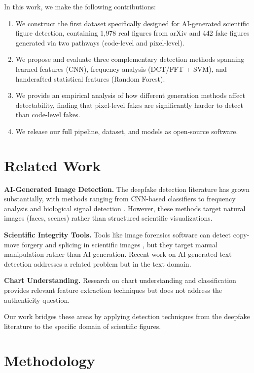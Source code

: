 \documentclass[11pt]{article}
\begin{document}
In this work, we make the following contributions:
\begin{enumerate}
    \item We construct the first dataset specifically designed for AI-generated scientific figure detection, containing 1,978 real figures from arXiv and 442 fake figures generated via two pathways (code-level and pixel-level).
    \item We propose and evaluate three complementary detection methods spanning learned features (CNN), frequency analysis (DCT/FFT + SVM), and handcrafted statistical features (Random Forest).
    \item We provide an empirical analysis of how different generation methods affect detectability, finding that pixel-level fakes are significantly harder to detect than code-level fakes.
    \item We release our full pipeline, dataset, and models as open-source software.
\end{enumerate}

\section{Related Work}

\textbf{AI-Generated Image Detection.} The deepfake detection literature has grown substantially, with methods ranging from CNN-based classifiers \citep{wang2020cnn} to frequency analysis \citep{frank2020leveraging} and biological signal detection \citep{ciftci2020fakecatcher}. However, these methods target natural images (faces, scenes) rather than structured scientific visualizations.

\textbf{Scientific Integrity Tools.} Tools like image forensics software can detect copy-move forgery and splicing in scientific images \citep{bik2016prevalence}, but they target manual manipulation rather than AI generation. Recent work on AI-generated text detection \citep{mitchell2023detectgpt} addresses a related problem but in the text domain.

\textbf{Chart Understanding.} Research on chart understanding and classification \citep{davila2021icdar} provides relevant feature extraction techniques but does not address the authenticity question.

Our work bridges these areas by applying detection techniques from the deepfake literature to the specific domain of scientific figures.

\section{Methodology}
\end{document}
